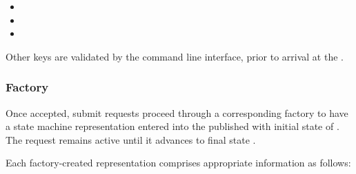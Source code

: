     \begin{itemize}
      \item \varProcessThreadCount
      \item \varNumberOfInstances
      \item \varSchedulingClass
    \end{itemize} 
    
    Other keys are validated by the command line interface, prior to arrival
    at the \varOrchestrator.
    
    \subsubsection{Factory} 
    
    Once accepted, submit requests proceed through a corresponding factory
    to have a state machine representation entered into the published
    \varORmap with initial state of \varReceived.  The request remains 
    active until it advances to final state \varCompleted.
    
    Each factory-created representation comprises appropriate information as follows:
    
